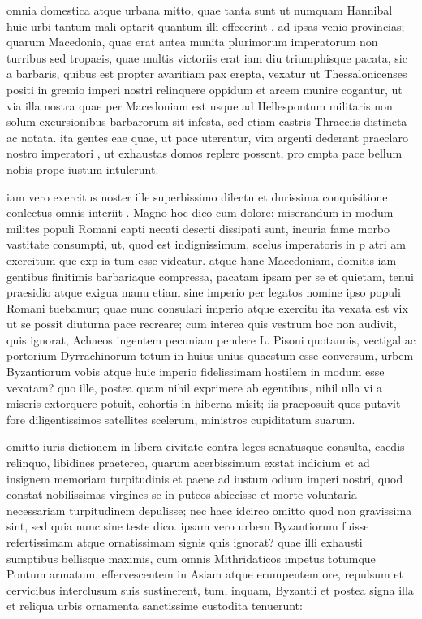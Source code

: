  omnia domestica atque urbana mitto, quae tanta sunt ut numquam Hannibal huic urbi tantum mali optarit quantum illi effecerint . ad ipsas venio provincias; quarum Macedonia, quae erat antea munita plurimorum imperatorum non turribus sed tropaeis, quae multis victoriis erat iam diu triumphisque pacata, sic a barbaris, quibus est propter avaritiam pax erepta, vexatur ut Thessalonicenses positi in gremio imperi nostri relinquere oppidum et arcem munire cogantur, ut via illa nostra quae per Macedoniam est usque ad Hellespontum militaris non solum excursionibus barbarorum sit infesta, sed etiam castris Thraeciis distincta ac notata. ita gentes eae quae, ut pace uterentur, vim argenti dederant praeclaro nostro imperatori , ut exhaustas domos replere possent, pro empta pace bellum nobis prope iustum intulerunt.

 iam vero exercitus noster ille superbissimo dilectu et durissima conquisitione conlectus omnis interiit . Magno hoc dico cum dolore: miserandum in modum milites populi Romani capti necati deserti dissipati sunt, incuria fame morbo vastitate consumpti, ut, quod est indignissimum, scelus imperatoris in p atri am exercitum que exp ia tum esse videatur. atque hanc Macedoniam, domitis iam gentibus finitimis barbariaque compressa, pacatam ipsam per se et quietam, tenui praesidio atque exigua manu etiam sine imperio per legatos nomine ipso populi Romani tuebamur; quae nunc consulari imperio atque exercitu ita vexata est vix ut se possit diuturna pace recreare; cum interea quis vestrum hoc non audivit, quis ignorat, Achaeos ingentem pecuniam pendere L. Pisoni quotannis, vectigal ac portorium Dyrrachinorum totum in huius unius quaestum esse conversum, urbem Byzantiorum vobis atque huic imperio fidelissimam hostilem in modum esse vexatam? quo ille, postea quam nihil exprimere ab egentibus, nihil ulla vi a miseris extorquere potuit, cohortis in hiberna misit; iis praeposuit quos putavit fore diligentissimos satellites scelerum, ministros cupiditatum suarum.

 omitto iuris dictionem in libera civitate contra leges senatusque consulta, caedis relinquo, libidines praetereo, quarum acerbissimum exstat indicium et ad insignem memoriam turpitudinis et paene ad iustum odium imperi nostri, quod constat nobilissimas virgines se in puteos abiecisse et morte voluntaria necessariam turpitudinem depulisse; nec haec idcirco omitto quod non gravissima sint, sed quia nunc sine teste dico. ipsam vero urbem Byzantiorum fuisse refertissimam atque ornatissimam signis quis ignorat? quae illi exhausti sumptibus bellisque maximis, cum omnis Mithridaticos impetus totumque Pontum armatum, effervescentem in Asiam atque erumpentem ore, repulsum et cervicibus interclusum suis sustinerent, tum, inquam, Byzantii et postea signa illa et reliqua urbis ornamenta sanctissime custodita tenuerunt:

